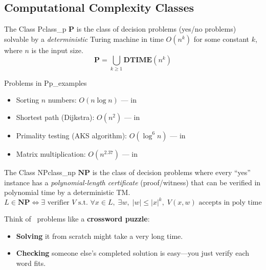 \documentclass[12pt,a4paper]{article}
\newcommand{\P}{\mathbf{P}}
\newcommand{\NP}{\mathbf{NP}}
\begin{document}
\subsection{Computational Complexity Classes}

\begin{definition}{The Class P}{class_p}
$\P$ is the class of decision problems (yes/no problems) solvable by a 
\emph{deterministic} Turing machine in time $O(n^k)$ for some constant $k$, 
where $n$ is the input size.
\[
  \P = \bigcup_{k \geq 1} \mathbf{DTIME}(n^k)
\]
\end{definition}

\begin{example}{Problems in P}{p_examples}
\begin{itemize}[leftmargin=2em]
  \item Sorting $n$ numbers: $O(n \log n)$ --- in \P
  \item Shortest path (Dijkstra): $O(n^2)$ --- in \P
  \item Primality testing (AKS algorithm): $O(\log^{6} n)$ --- in \P
  \item Matrix multiplication: $O(n^{2.37})$ --- in \P
\end{itemize}
\end{example}

\begin{definition}{The Class NP}{class_np}
$\NP$ is the class of decision problems where every ``yes'' instance has a 
\emph{polynomial-length certificate} (proof/witness) that can be verified 
in polynomial time by a deterministic TM.
\[
  L \in \NP \iff \exists \text{ verifier } V \text{ s.t. } 
  \forall x \in L,\; \exists w,\; |w| \leq |x|^k,\; V(x,w) \text{ accepts in poly time}
\]
\end{definition}

\begin{intuition}
Think of \NP\ problems like a \textbf{crossword puzzle}:
\begin{itemize}[leftmargin=2em]
  \item \textbf{Solving} it from scratch might take a very long time.
  \item \textbf{Checking} someone else's completed solution is easy---you just verify each word fits.
\end{itemize}
\end{intuition}
\end{document}
